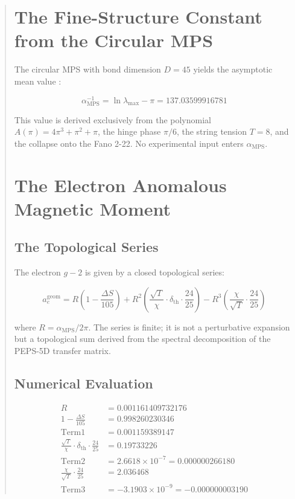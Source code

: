\documentclass[12pt]{article}
\begin{document}
\begin{abstract}
\section{The Fine-Structure Constant from the Circular MPS}

The circular MPS with bond dimension \(D=45\) yields the asymptotic mean value \cite{alpha_series}:

\begin{equation}
\boxed{\alpha_{\text{MPS}}^{-1} = \ln\lambda_{\max} - \pi = 137.03599916781}
\end{equation}

This value is derived exclusively from the polynomial \(A(\pi)=4\pi^3+\pi^2+\pi\), the hinge phase \(\pi/6\), the string tension \(T=8\), and the collapse onto the Fano 2-22. No experimental input enters \(\alpha_{\text{MPS}}\).

\section{The Electron Anomalous Magnetic Moment}

\subsection{The Topological Series}

The electron \(g-2\) is given by a closed topological series:

\begin{equation}
\boxed{
a_e^{\text{geom}} = R\left(1 - \frac{\Delta S}{105}\right) + R^2\left(\frac{\sqrt{T}}{\chi} \cdot \delta_{\text{th}} \cdot \frac{24}{25}\right) - R^3\left(\frac{\chi}{\sqrt{T}} \cdot \frac{24}{25}\right)
}
\label{eq:ae}
\end{equation}

where \(R = \alpha_{\text{MPS}}/2\pi\). The series is finite; it is not a perturbative expansion but a topological sum derived from the spectral decomposition of the PEPS-5D transfer matrix.

\subsection{Numerical Evaluation}

\begin{align}
R &= 0.001161409732176 \\
1 - \frac{\Delta S}{105} &= 0.998260230346 \\
\text{Term1} &= 0.001159389147 \\
\frac{\sqrt{T}}{\chi} \cdot \delta_{\text{th}} \cdot \frac{24}{25} &= 0.19733226 \\
\text{Term2} &= 2.6618 \times 10^{-7} = 0.000000266180 \\
\frac{\chi}{\sqrt{T}} \cdot \frac{24}{25} &= 2.036468 \\
\text{Term3} &= -3.1903 \times 10^{-9} = -0.000000003190
\end{align}


\end{abstract}
\end{document}

